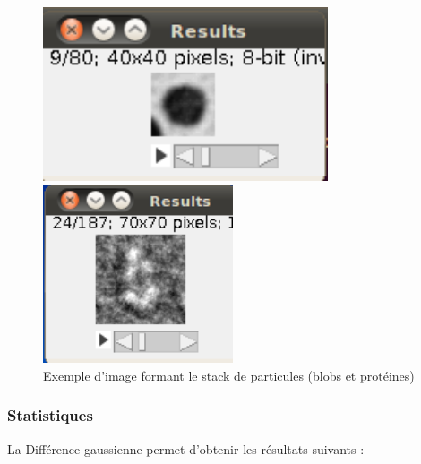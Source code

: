 \begin{figure}[ht]
\begin{center}
 \begin{minipage}{.450\linewidth}
  \includegraphics[width=0.75\textwidth]{cropblob.png}  
 \end{minipage} \hfill
\begin{minipage}{.450\linewidth}
  \includegraphics[width=0.5\textwidth]{cropprotDog.png}   
 \end{minipage} \hfill
\caption{Exemple d'image formant le stack de particules (blobs et protéines)}
\end{center}
\end{figure}

\subsubsection*{Statistiques}

La Différence gaussienne permet d'obtenir les résultats suivants :


